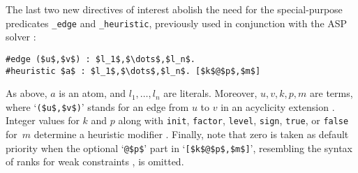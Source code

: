 The last two new directives of interest abolish the need for %
the special-purpose predicates \lstinline{_edge} and \lstinline{_heuristic},
previously used in conjunction with the ASP solver \clasp:
\begin{lstlisting}[numbers=none,mathescape=t]
#edge ($u$,$v$) : $l_1$,$\dots$,$l_n$.
#heuristic $a$ : $l_1$,$\dots$,$l_n$. [$k$@$p$,$m$]
\end{lstlisting}
As above, $a$ is an atom, and $l_1,\dots,l_n$ are literals.
Moreover,
$u,v,k,p,m$ are terms, %
where 
`\lstinline[mathescape=t]{($u$,$v$)}' stands for an
edge from $u$ to $v$ in an acyclicity extension \cite{bogejakasc15a}.
Integer values for $k$ and $p$ along with
\lstinline{init}, \lstinline{factor}, \lstinline{level}, \lstinline{sign}, \lstinline{true}, or \lstinline{false} for~$m$
determine a heuristic modifier \cite{gekaotroscwa13a}.
Finally, note that
zero is taken as default priority when
the optional `\lstinline[mathescape=t]{@$p$}' part 
in `\lstinline[mathescape=t]{[$k$@$p$,$m$]}',
resembling the syntax of ranks for weak constraints \cite{aspcore2},
is omitted.
